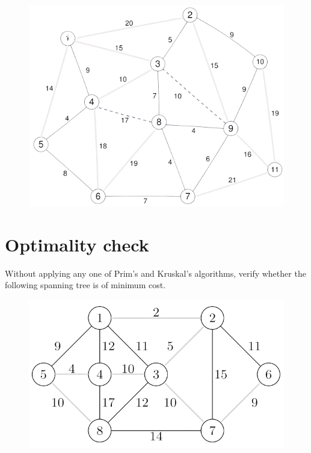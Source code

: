 \documentclass[12pt, a4paper]{report}
\newtheorem[style=M,bodystyle=\normalfont]{theorem}{Theorem}
\newtheorem[style=M,bodystyle=\normalfont]{corollary}{Corollary}
\newtheorem[style=M,bodystyle=\normalfont]{lemma}{Lemma}
\newtheorem[style=M,bodystyle=\normalfont]{definition}{Definition}
\begin{document}
\begin{enumerate}
\begin{figure}[H]
                    \includegraphics[width=0.75\linewidth]{images/kruskal.png}
                \end{figure}
        \end{enumerate}

    \newpage

    \section{Optimality check}
        Without applying any one of Prim's and Kruskal's algorithms, verify whether the following spanning tree is of minimum cost. 
        \begin{figure}[H]
            \centering
            \includegraphics[width=0.5\linewidth]{images/optimality.png}
        \end{figure}
\end{document}
